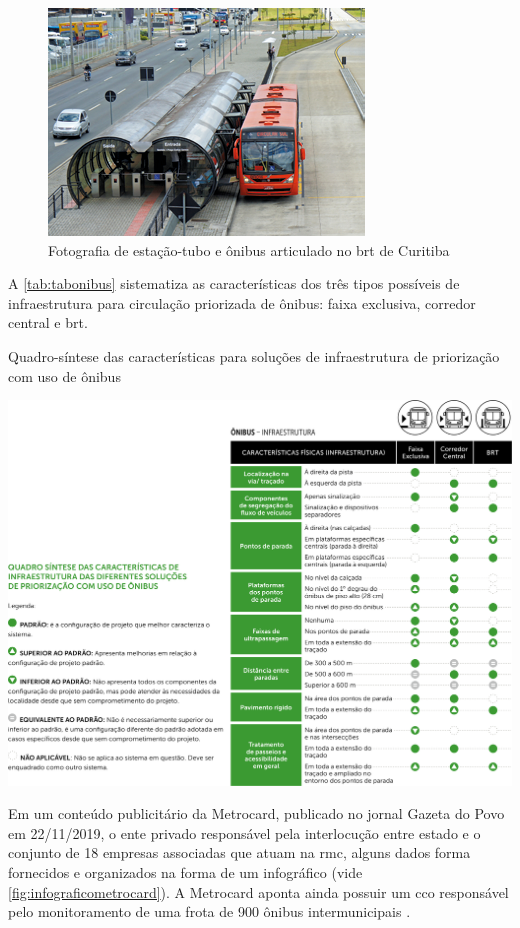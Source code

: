 	\begin{figure}
		\centering
		\caption{Fotografia de estação-tubo e ônibus articulado no \gls{brt} de Curitiba}
		\label{fig:brtsul}
		\includegraphics[width=0.65\linewidth]{img/guiatpc2018a_03}
	\end{figure}

	A \autoref{tab:tabonibus} sistematiza as características dos três tipos possíveis de infraestrutura para circulação priorizada de ônibus: faixa exclusiva, corredor central e \gls{brt}.
	
	\begin{landscape}
		\begin{table}
			\centering
			\caption{Quadro-síntese das características para soluções de infraestrutura de priorização com uso de ônibus}
			\label{tab:tabonibus}
			\includegraphics[width=0.75\linewidth]{img/guiatpc2018a_02}
		\end{table}
	\end{landscape}

	Em um conteúdo publicitário da Metrocard, publicado no jornal Gazeta do Povo em 22/11/2019, o ente privado responsável pela interlocução entre estado e o conjunto de 18 empresas associadas que atuam na \gls{rmc}, alguns dados forma fornecidos e organizados na forma de um infográfico (vide \autoref{fig:infograficometrocard}). A Metrocard aponta ainda possuir um \gls{cco} responsável pelo monitoramento de uma frota de 900 ônibus intermunicipais \cite{boreki2019a}.
	
